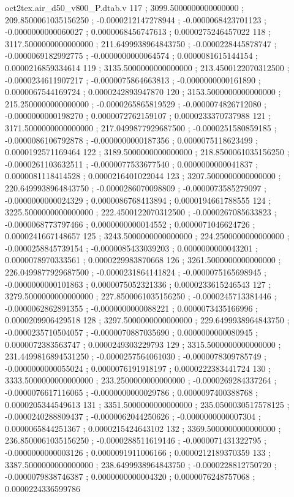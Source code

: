 \begin{filecontents}[overwrite]{oct2tex.air_d50_v800_P.dtab.v}
117 ; 3099.5000000000000000 ; 209.8500061035156250 ; -0.0000212147278944 ; -0.0000068423701123 ; -0.0000000000060027 ; 0.0000068456747613 ; 0.0000275246457022
118 ; 3117.5000000000000000 ; 211.6499938964843750 ; -0.0000228445878747 ; -0.0000069182992775 ; -0.0000000000064574 ; 0.0000081615144154 ; 0.0000216859334614
119 ; 3135.5000000000000000 ; 213.4500122070312500 ; -0.0000234611907217 ; -0.0000075864663813 ; -0.0000000000161890 ; 0.0000067544169724 ; 0.0000242893947870
120 ; 3153.5000000000000000 ; 215.2500000000000000 ; -0.0000265865819529 ; -0.0000074826712080 ; -0.0000000000198270 ; 0.0000072762159107 ; 0.0000233370737988
121 ; 3171.5000000000000000 ; 217.0499877929687500 ; -0.0000251580859185 ; -0.0000086106792878 ; -0.0000000000187356 ; 0.0000075118623499 ; 0.0000192571169464
122 ; 3189.5000000000000000 ; 218.8500061035156250 ; -0.0000261103632511 ; -0.0000077533677540 ; 0.0000000000041837 ; 0.0000081118414528 ; 0.0000216401022044
123 ; 3207.5000000000000000 ; 220.6499938964843750 ; -0.0000286070098809 ; -0.0000073585279097 ; -0.0000000000024329 ; 0.0000086768413894 ; 0.0000194661788555
124 ; 3225.5000000000000000 ; 222.4500122070312500 ; -0.0000267085633823 ; -0.0000068773797466 ; 0.0000000000014552 ; 0.0000071046624726 ; 0.0000241667148657
125 ; 3243.5000000000000000 ; 224.2500000000000000 ; -0.0000258845739154 ; -0.0000085433039203 ; 0.0000000000043201 ; 0.0000078970333561 ; 0.0000229983870668
126 ; 3261.5000000000000000 ; 226.0499877929687500 ; -0.0000231864141824 ; -0.0000075165698945 ; -0.0000000000101863 ; 0.0000075052321336 ; 0.0000233615246543
127 ; 3279.5000000000000000 ; 227.8500061035156250 ; -0.0000245713381446 ; -0.0000062862891355 ; -0.0000000000088221 ; 0.0000073435166996 ; 0.0000209906429518
128 ; 3297.5000000000000000 ; 229.6499938964843750 ; -0.0000235710504057 ; -0.0000070887035690 ; 0.0000000000080945 ; 0.0000072383563747 ; 0.0000249303229793
129 ; 3315.5000000000000000 ; 231.4499816894531250 ; -0.0000257564061030 ; -0.0000078309785749 ; -0.0000000000055024 ; 0.0000076191918197 ; 0.0000222383441724
130 ; 3333.5000000000000000 ; 233.2500000000000000 ; -0.0000269284337264 ; -0.0000076617116065 ; -0.0000000000029786 ; 0.0000097400388768 ; 0.0000205344549613
131 ; 3351.5000000000000000 ; 235.0500030517578125 ; -0.0000240288809437 ; -0.0000062044250626 ; -0.0000000000007304 ; 0.0000065844251367 ; 0.0000215424643102
132 ; 3369.5000000000000000 ; 236.8500061035156250 ; -0.0000288511619146 ; -0.0000071431322795 ; -0.0000000000003126 ; 0.0000091911006166 ; 0.0000212189370359
133 ; 3387.5000000000000000 ; 238.6499938964843750 ; -0.0000228812750720 ; -0.0000079838746387 ; 0.0000000000004320 ; 0.0000076248757068 ; 0.0000224336599786

\end{filecontents}
